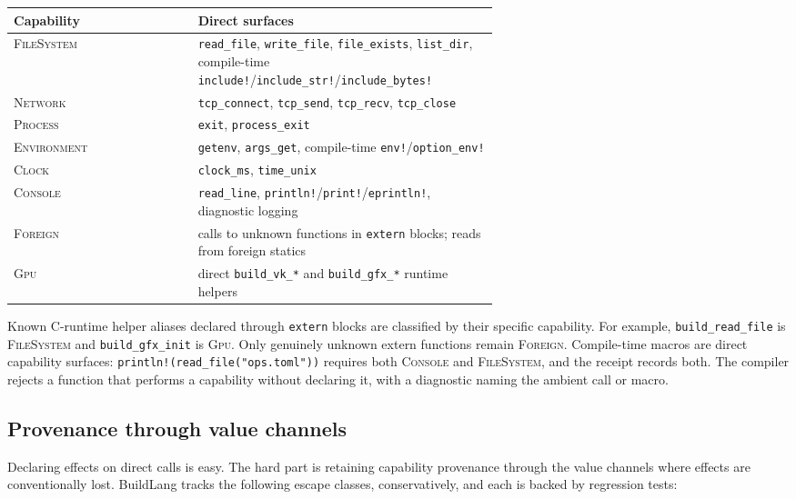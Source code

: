 \documentclass[11pt]{article}
\begin{document}
\begin{center}\small
\begin{tabular}{l p{0.62\linewidth}}
\toprule
Capability & Direct surfaces \\
\midrule
\textsc{FileSystem} & \texttt{read\_file}, \texttt{write\_file}, \texttt{file\_exists}, \texttt{list\_dir}, compile-time \texttt{include!}/\texttt{include\_str!}/\texttt{include\_bytes!} \\
\textsc{Network} & \texttt{tcp\_connect}, \texttt{tcp\_send}, \texttt{tcp\_recv}, \texttt{tcp\_close} \\
\textsc{Process} & \texttt{exit}, \texttt{process\_exit} \\
\textsc{Environment} & \texttt{getenv}, \texttt{args\_get}, compile-time \texttt{env!}/\texttt{option\_env!} \\
\textsc{Clock} & \texttt{clock\_ms}, \texttt{time\_unix} \\
\textsc{Console} & \texttt{read\_line}, \texttt{println!}/\texttt{print!}/\texttt{eprintln!}, diagnostic logging \\
\textsc{Foreign} & calls to unknown functions in \texttt{extern} blocks; reads from foreign statics \\
\textsc{Gpu} & direct \texttt{build\_vk\_*} and \texttt{build\_gfx\_*} runtime helpers \\
\bottomrule
\end{tabular}
\end{center}

Known C-runtime helper aliases declared through \texttt{extern} blocks are classified by their specific capability. For example, \texttt{build\_read\_file} is \textsc{FileSystem} and \texttt{build\_gfx\_init} is \textsc{Gpu}. Only genuinely unknown extern functions remain \textsc{Foreign}. Compile-time macros are direct capability surfaces: \texttt{println!(read\_file("ops.toml"))} requires both \textsc{Console} and \textsc{FileSystem}, and the receipt records both. The compiler rejects a function that performs a capability without declaring it, with a diagnostic naming the ambient call or macro.

\subsection{Provenance through value channels}

Declaring effects on direct calls is easy. The hard part is retaining capability provenance through the value channels where effects are conventionally lost. BuildLang tracks the following escape classes, conservatively, and each is backed by regression tests:
\end{document}
